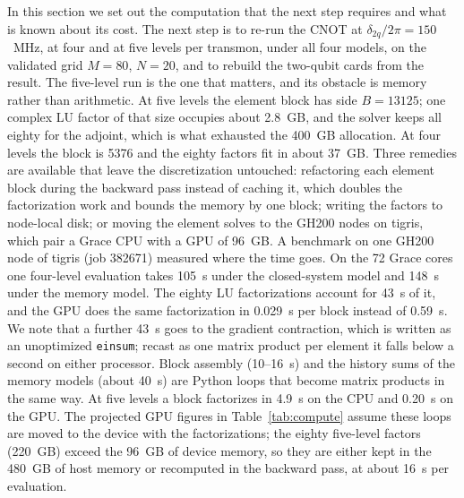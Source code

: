 \documentclass[10pt]{article}
\begin{document}
In this section we set out the computation that the next step requires and
what is known about its cost. The next step is to re-run the CNOT at
$\delta_{2q}/2\pi = 150$~MHz, at four and at five levels per transmon, under
all four models, on the validated grid $M = 80$, $N = 20$, and to rebuild the
two-qubit cards from the result. The five-level run is the one that matters,
and its obstacle is memory rather than arithmetic. At five levels the element
block has side $B = 13125$; one complex LU factor of that size occupies about
2.8~GB, and the solver keeps all eighty for the adjoint, which is what exhausted
the 400~GB allocation. At four levels the block is 5376 and the eighty factors
fit in about 37~GB. Three remedies are available that leave the discretization
untouched: refactoring each element block during the backward pass instead of
caching it, which doubles the factorization work and bounds the memory by one
block; writing the factors to node-local disk; or moving the element solves to
the GH200 nodes on tigris, which pair a Grace CPU with a GPU of 96~GB. A
benchmark on one GH200 node of tigris (job 382671) measured where the time goes.
On the 72 Grace cores one four-level evaluation takes 105~s under the
closed-system model and 148~s under the memory model. The eighty LU
factorizations account for 43~s of it, and the GPU does the same factorization
in 0.029~s per block instead of 0.59~s. We note that a further 43~s goes to the
gradient contraction, which is written as an unoptimized \texttt{einsum}; recast
as one matrix product per element it falls below a second on either processor.
Block assembly (10--16~s) and the history sums of the memory models (about
40~s) are Python loops that become matrix products in the same way. At five
levels a block factorizes in 4.9~s on the CPU and 0.20~s on the GPU. The
projected GPU figures in Table~\ref{tab:compute} assume these loops are moved
to the device with the factorizations; the eighty five-level factors (220~GB)
exceed the 96~GB of device memory, so they are either kept in the 480~GB of host
memory or recomputed in the backward pass, at about 16~s per evaluation.
\end{document}
